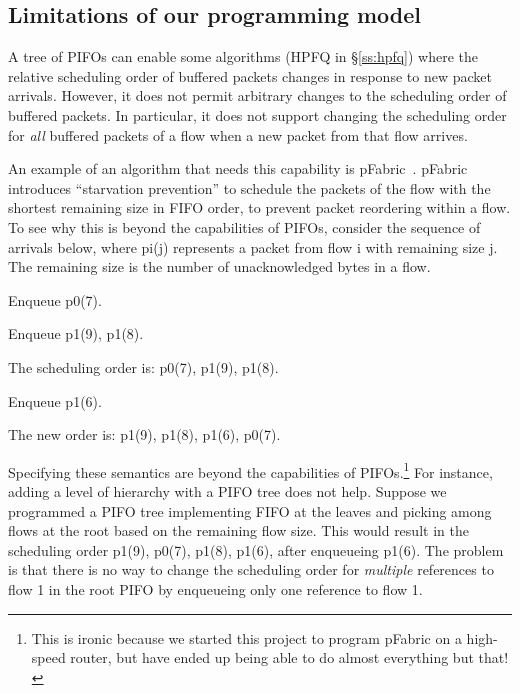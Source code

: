\subsection{Limitations of our programming model}
\label{pifo_ss:limitations}

A tree of PIFOs can enable some algorithms (\eg HPFQ in \S\ref{ss:hpfq}) where
the relative scheduling order of buffered packets changes in response to new
packet arrivals. However, it does not permit arbitrary changes to the
scheduling order of buffered packets. In particular, it does not support
changing the scheduling order for {\em all} buffered packets of a flow when a
new packet from that flow arrives.

An example of an algorithm that needs this capability is
pFabric~\cite{pFabric}. pFabric introduces ``starvation prevention'' to
schedule the packets of the flow with the shortest remaining size in FIFO
order, to prevent packet reordering within a flow. To see why this is beyond
the capabilities of PIFOs, consider the sequence of arrivals below, where pi(j)
represents a packet from flow i with remaining size j. The remaining size
is the number of unacknowledged bytes in a flow.
\begin{CompactEnumerate}
\item Enqueue p0(7).
\item Enqueue p1(9), p1(8).
\item The scheduling order is: p0(7), p1(9), p1(8).
\item Enqueue p1(6).
\item The new order is: p1(9), p1(8), p1(6), p0(7).
\end{CompactEnumerate}

Specifying these semantics are beyond the capabilities of PIFOs.\footnote{This
is ironic because we started this project to program pFabric on a high-speed
router, but have ended up being able to do almost everything but that!} For
instance, adding a level of hierarchy with a PIFO tree does not help. Suppose
we programmed a PIFO tree implementing FIFO at the leaves and picking among
flows at the root based on the remaining flow size. This would result in the
scheduling order p1(9), p0(7), p1(8), p1(6), after enqueueing p1(6). The problem
is that there is no way to change the scheduling order for {\em multiple}
references to flow 1 in the root PIFO by enqueueing only one reference to flow
1.

